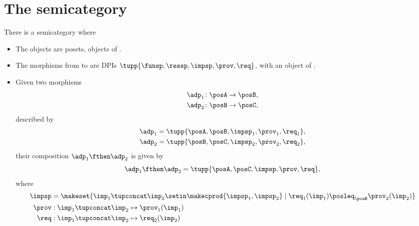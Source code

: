 \section{The semicategory \DPI}
\label{sec:DPI-semicat}
\begin{definition}
    \label{def:DPIcat}
    There is a semicategory \DPI where
    \begin{itemize}
        \item The objects are posets, objects of \PosL.
        \item The morphisms from \funsp to \ressp are DPIs $\tupp{\funsp,\ressp,\impsp,\prov,\req}$, with \impsp an object of \SetL.
        \item Given two morphisms
              \begin{align}
                  \adp_1 & \colon \posA \to \posB , \\
                  \adp_2 & \colon \posB \to \posC,
              \end{align}
              described by
              \begin{align}
                  \adp_1 & = \tupp{\posA,\posB,\impsp_1,\prov_1,\req_1}, \\
                  \adp_2 & = \tupp{\posB,\posC,\impsp_2,\prov_2,\req_2},
              \end{align}
              their composition $\adp_1 \fthen \adp_2$ is given by
              \begin{equation}
                  \adp_1 \fthen \adp_2 = \tupp{\posA,\posC,\impsp,\prov,\req},
              \end{equation}
              where
              \begin{align}
                  \impsp & = \makeset{ \imp_1 \tupconcat \imp_2 \setin \makecprod{\impsp_1, \impsp_2} \mid \req_1(\imp_1) \posleq_{\posB} \prov_2(\imp_2)} \\
                  \prov  & : \imp_1 \tupconcat \imp_2 \mapsto \prov_1(\imp_1) \\
                  \req   & : \imp_1 \tupconcat \imp_2 \mapsto \req_2(\imp_2)
              \end{align}
    \end{itemize}
\end{definition}

